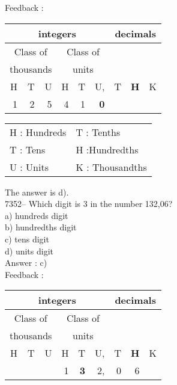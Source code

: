 \documentclass[letterpaper, 12pt]{article}
\begin{document}
Feedback :\\
\begin{center}
\begin{tabular}{|rrr|rrr|rrr|}
\hline
\multicolumn{6}{|c|}{integers} &\multicolumn{3}{|c|}{decimals} \\
\hline
\multicolumn{3}{|c|}{Class of} &\multicolumn{3}{|c|}{Class of} &  \multicolumn{3}{c|}{} \\
\multicolumn{3}{|c|}{thousands} &\multicolumn{3}{|c|}{units} &  \multicolumn{3}{c|}{} \\
\hline
H & T & U &H & T & U, & T\up{th} & \textbf{H\up{th}} & K\up{th} \\
\hline
\hline
 1 & 2 & 5 & 4 & 1 & \textbf{0} & & &  \\
\hline
\end{tabular}
\end{center}

\scriptsize
\begin{center}
\begin{tabular}{ll}
H : Hundreds & T\up{th} : Tenths\\
T : Tens & H\up{th} :Hundredths\\
U : Units & K\up{e} : Thousandths\\
\end{tabular}
\end{center}

\normalsize
The answer is d).\\

7352-- Which digit is 3 in the number 132,06?\\

a) hundreds digit\\
b) hundredths digit\\
c) tens digit\\
d) units digit\\

Answer : c)\\

Feedback :\\
\begin{center}
\begin{tabular}{|rrr|rrr|rrr|}
\hline
\multicolumn{6}{|c|}{integers} &\multicolumn{3}{|c|}{decimals} \\
\hline
\multicolumn{3}{|c|}{Class of} &\multicolumn{3}{|c|}{Class of} &  \multicolumn{3}{c|}{} \\
\multicolumn{3}{|c|}{thousands} &\multicolumn{3}{|c|}{units} &  \multicolumn{3}{c|}{} \\
\hline
H & T & U &H & T & U, & T\up{th} & \textbf{H\up{th}} & K\up{th} \\
\hline
\hline
 & & &1 & \textbf{3} & 2, & 0 & 6 & \\
\hline
\end{tabular}
\end{center}
\end{document}
